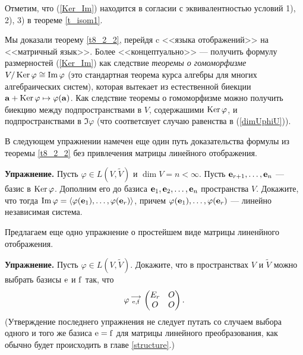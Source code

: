 \otstup 

Отметим, что (\ref{Ker_Im}) находится в согласии с эквивалентностью условий 1), 2), 3) 
в теореме \ref{t_isom1}.

\otstup 

{\footnotesize
Мы доказали теорему \ref{t8_2_2}, перейдя c <<языка отображений>> на <<матричный язык>>. Более <<концептуально>> ---
получить формулу размерностей (\ref{Ker_Im}) как следствие 
{\it теоремы о гомоморфизме}  $V / \mathop{\rm Ker}\nolimits \varphi \cong \mathop{\rm Im}\nolimits \varphi$ (это стандартная теорема 
курса алгебры для многих алгебраических систем), которая вытекает из естественной биекции
$\mathbf{a}+ \mathop{\rm Ker}\nolimits \varphi \mapsto \varphi (\mathbf{a})$.
Как следствие теоремы о гомоморфизме можно получить биекцию между подпространствами в $V$, содержашими $\mathop{\rm Ker}\nolimits \varphi$, и подпространствами в $\Im \varphi$ (что соответсвует случаю равенства в (\ref{dimUphiU})).
}

\otstup 

В следующем упражнении намечен еще один путь доказательства формулы из теоремы \ref{t8_2_2} без привлечения матрицы линейного отображения.

\otstup

{\bf Упражнение.} Пусть $\varphi \in L(V, \widetilde{V})$ и $\dim V =n < \infty $.
Пусть $\mathbf{e}_{r+1}, \ldots, \mathbf{e}_{n}$ --- базис в $\mathop{\rm Ker}\nolimits \varphi$. Дополним его до базиса 
$\mathbf{e}_{1}, \mathbf{e}_{2}, \ldots, \mathbf{e}_{n}$ пространства $V$. 
Докажите, что тогда $\mathop{\rm Im}\nolimits \varphi = \langle \varphi (\mathbf{e}_{1}), \ldots, \varphi (\mathbf{e}_{r}) \rangle$, причем 
$\varphi (\mathbf{e}_{1}), \ldots, \varphi (\mathbf{e}_{r})$ --- линейно независимая система.

\otstup

Предлагаем еще одно упражнение о простейшем виде матрицы линенйного отображения.

\otstup

{\bf Упражнение.} 
Пусть $\varphi \in L(V, \widetilde{V})$. Докажите, что в пространствах $V$ и $\widetilde{V}$ можно выбрать базисы $\mathrm{e}$ и $\mathrm{f}$
так, что %
$$\varphi \begin{smallmatrix} \longrightarrow \\ \mathrm{e}, \mathrm{f} \end{smallmatrix} \begin{pmatrix}
E_r & O \\
O & O
\end{pmatrix}.$$
(Утверждение последнего упражнения не следует путать со случаем выбора одного и того же базиса $\mathrm{e} = \mathrm{f}$
для матрицы линейного преобразования, как обычно будет происходить в главе \ref{structure}.)




